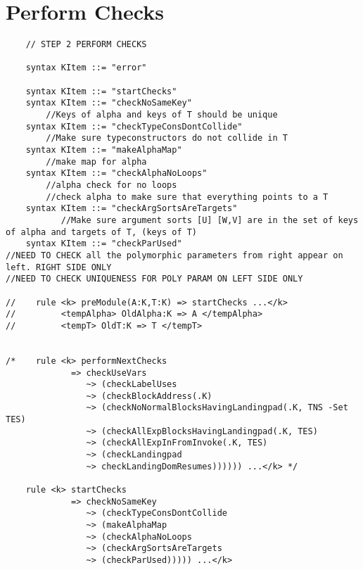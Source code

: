 \section{Perform Checks}
\begin{lstlisting}
    // STEP 2 PERFORM CHECKS

    syntax KItem ::= "error"

    syntax KItem ::= "startChecks"
    syntax KItem ::= "checkNoSameKey"
        //Keys of alpha and keys of T should be unique
    syntax KItem ::= "checkTypeConsDontCollide"
        //Make sure typeconstructors do not collide in T
    syntax KItem ::= "makeAlphaMap"
        //make map for alpha
    syntax KItem ::= "checkAlphaNoLoops"
        //alpha check for no loops
        //check alpha to make sure that everything points to a T
    syntax KItem ::= "checkArgSortsAreTargets"
           //Make sure argument sorts [U] [W,V] are in the set of keys of alpha and targets of T, (keys of T)
    syntax KItem ::= "checkParUsed"
//NEED TO CHECK all the polymorphic parameters from right appear on left. RIGHT SIDE ONLY
//NEED TO CHECK UNIQUENESS FOR POLY PARAM ON LEFT SIDE ONLY

//    rule <k> preModule(A:K,T:K) => startChecks ...</k>
//         <tempAlpha> OldAlpha:K => A </tempAlpha>
//         <tempT> OldT:K => T </tempT>


/*    rule <k> performNextChecks
             => checkUseVars
                ~> (checkLabelUses
                ~> (checkBlockAddress(.K)
                ~> (checkNoNormalBlocksHavingLandingpad(.K, TNS -Set TES)
                ~> (checkAllExpBlocksHavingLandingpad(.K, TES)
                ~> (checkAllExpInFromInvoke(.K, TES)
                ~> (checkLandingpad
                ~> checkLandingDomResumes)))))) ...</k> */

    rule <k> startChecks
             => checkNoSameKey
                ~> (checkTypeConsDontCollide
                ~> (makeAlphaMap
                ~> (checkAlphaNoLoops
                ~> (checkArgSortsAreTargets
                ~> (checkParUsed))))) ...</k>

\end{lstlisting}

